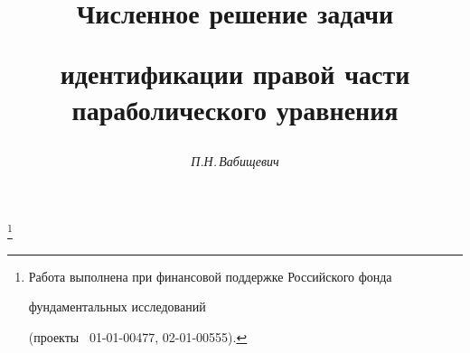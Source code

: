 




%





\newcommand{\tts}[1]{}







\setcounter{page}{29}















\author{\it П.Н.\,Вабищевич}




\title{Численное решение задачи


идентификации правой части параболического уравнения}


\thanks{Работа выполнена при финансовой поддержке Российского фонда 


фундаментальных исследований


(проекты \No \No~01-01-00477, 02-01-00555).}





\date{}




\pagestyle{plain} %







\maketitle


